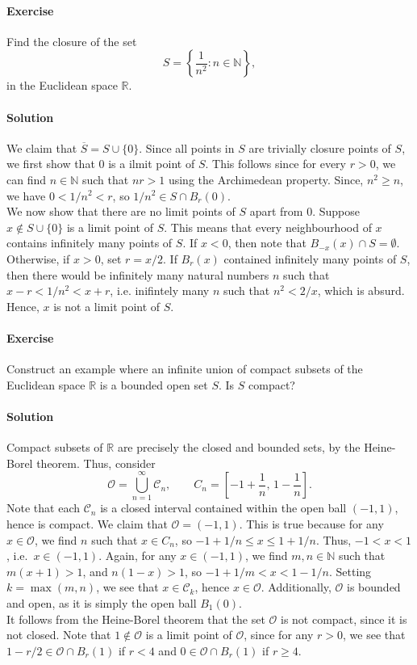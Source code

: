 \documentclass[10pt]{article}
\newcounter{prob}
\def\problem{\stepcounter{prob}\paragraph{Exercise \arabic{prob}}}
\def\solution{\paragraph{Solution}}
\newcommand\cl[1]{\overline{#1}}
\def\O{\mathcal{O}}
\def\C{\mathcal{C}}
\begin{document}
        \problem Find the closure of the set
        \[
                S = \left\{\frac{1}{n^2}: n \in \mathbb{N}\right\},
        \]
        in the Euclidean space $\mathbb{R}$.

        \solution We claim that $\cl{S} = S \cup \{0\}$. Since all points in $S$ are trivially closure points of $S$, we first show that 
        $0$ is a ilmit point of $S$. This follows since for every $r > 0$, we can find $n \in \mathbb{N}$ such that $nr > 1$ using the
        Archimedean property. Since, $n^2 \geq n$, we have $0 < 1 /n^2 < r$, so $1 /n^2 \in S \cap B_r(0)$. \\

        We now show that there are no limit points of $S$ apart from $0$. Suppose $x \notin S\cup\{0\}$ is a limit point of $S$.
        This means that every neighbourhood of $x$ contains infinitely many points of $S$. If $x < 0$, then note that $B_{-x}(x) \cap S = \emptyset$.
        Otherwise, if $x > 0$, set $r = x /2$. If $B_r(x)$ contained infinitely many points of $S$, then there would be infinitely many
        natural numbers $n$ such that $x - r < 1 /n^2 < x + r$, i.e. inifintely many $n$ such that $n^2 < 2 /x$, which is absurd.
        Hence, $x$ is not a limit point of $S$.

        \problem Construct an example where an infinite union of compact subsets of the Euclidean space $\mathbb{R}$ is a bounded
        open set $S$. Is $S$ compact?

        \solution Compact subsets of $\mathbb{R}$ are precisely the closed and bounded sets, by the Heine-Borel theorem. Thus, consider
        \[
                \O = \bigcup_{n = 1}^\infty \C_n, \qquad C_n = \left[-1 + \frac{1}{n},\, 1 - \frac{1}{n}\right].
        \]
        Note that each $\C_n$ is a closed interval contained within the open ball $(-1, 1)$, hence is compact. We claim that $\O = (-1, 1)$.
        This is true because for any $x \in \O$, we find $n$ such that  $x \in C_n$, so $-1 + 1 /n \leq x \leq 1 + 1 /n$.
        Thus, $-1 < x < 1$, i.e.\ $x \in (-1, 1)$.
        Again, for any $x \in (-1, 1)$, we find $m, n \in \mathbb{N}$ such that $m(x + 1) > 1$, and $n(1 - x) > 1$, so $-1 + 1 /m < x < 1 - 1 /n$.
        Setting $k = \max(m, n)$, we see that $x \in \C_k$, hence $x \in \O$.
        Additionally, $\O$ is bounded and open, as it is simply the open ball $B_1(0)$. \\

        It follows from the Heine-Borel theorem that the set $\O$ is not compact, since it is not closed. Note that $1 \notin \O$ is a limit point of
        $\O$, since for any $r > 0$, we see that $1 - r /2 \in \O \cap B_r(1)$ if $r < 4$ and $0 \in \O \cap B_r(1)$ if $r \geq 4$.
\end{document}
